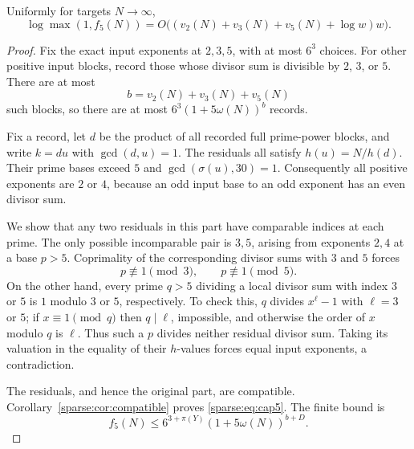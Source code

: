 \begin{theorem}\label{sparse:thm:cap5}
Uniformly for targets $N\to\infty$,
\begin{equation}\label{sparse:eq:cap5}
 \boxed{\log\max(1,f_5(N))
 =O\bigl((v_2(N)+v_3(N)+v_5(N)+\log w)w\bigr).}
\end{equation}
\end{theorem}
\begin{proof}
Fix the exact input exponents at $2,3,5$, with at most $6^3$ choices. For other positive input blocks, record those whose divisor sum is divisible by $2$, $3$, or $5$. There are at most
\[
 b=v_2(N)+v_3(N)+v_5(N)
\]
such blocks, so there are at most $6^3(1+5\omega(N))^b$ records.

Fix a record, let $d$ be the product of all recorded full prime-power blocks, and write $k=du$ with $\gcd(d,u)=1$. The residuals all satisfy $h(u)=N/h(d)$. Their prime bases exceed $5$ and $\gcd(\sigma(u),30)=1$. Consequently all positive exponents are $2$ or $4$, because an odd input base to an odd exponent has an even divisor sum.

We show that any two residuals in this part have comparable indices at each prime. The only possible incomparable pair is $3,5$, arising from exponents $2,4$ at a base $p>5$. Coprimality of the corresponding divisor sums with $3$ and $5$ forces
\[
 p\not\equiv1\pmod3,\qquad p\not\equiv1\pmod5.
\]
On the other hand, every prime $q>5$ dividing a local divisor sum with index $3$ or $5$ is $1$ modulo $3$ or $5$, respectively. To check this, $q$ divides $x^\ell-1$ with $\ell=3$ or $5$; if $x\equiv1\pmod q$ then $q\mid\ell$, impossible, and otherwise the order of $x$ modulo $q$ is $\ell$. Thus such a $p$ divides neither residual divisor sum. Taking its valuation in the equality of their $h$-values forces equal input exponents, a contradiction.

The residuals, and hence the original part, are compatible. Corollary~\ref{sparse:cor:compatible} proves \eqref{sparse:eq:cap5}. The finite bound is
\[
 f_5(N)\le6^{3+\pi(Y)}(1+5\omega(N))^{b+D}.
\]
\end{proof}


